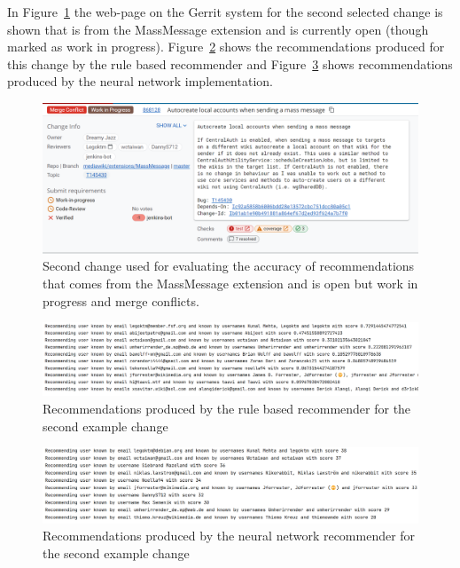 In Figure~\ref{fig:massmessage-example-change} the web-page on the Gerrit system for the second selected change is shown that is from the MassMessage extension and is currently open (though marked as work in progress). Figure~\ref{fig:rule-based-recommender-result-for-example-change-2} shows the recommendations produced for this change by the rule based recommender and Figure~\ref{fig:neural-network-recommender-result-for-example-change-2} shows recommendations produced by the neural network implementation.

\begin{figure}[H]
    \centering
    \includegraphics[scale=0.6]{images/massmessage-example-change-2.png}
    \caption{Second change used for evaluating the accuracy of recommendations that comes from the MassMessage extension and is open but work in progress and merge conflicts.}
    \label{fig:massmessage-example-change}
\end{figure}

\begin{figure}[H]
    \centering
    \includegraphics[scale=0.5]{images/rule-based-recommender-example-2.png}
    \caption{Recommendations produced by the rule based recommender for the second example change}
    \label{fig:rule-based-recommender-result-for-example-change-2}
\end{figure}

\begin{figure}[H]
    \centering
    \includegraphics[scale=0.55]{images/neural-network-example-2.png}
    \caption{Recommendations produced by the neural network recommender for the second example change}
    \label{fig:neural-network-recommender-result-for-example-change-2}
\end{figure}

